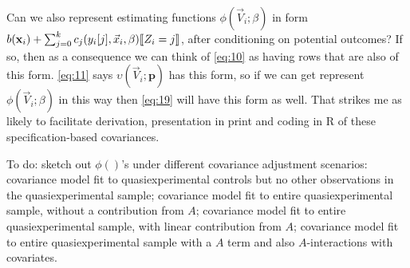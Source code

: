\documentclass{article}
\DeclarePairedDelimiter{\indicator}{\llbracket}{\rrbracket}
\newcommand{\absorbInterceptsEF}{\upsilon}
\begin{document}
Can we also represent estimating functions
$\phi(\vec{V}_{i}; \beta)$ in form
$b(\mathbf{x}_{i}) + \sum_{j=0}^{k}c_{j}(y_{i}[j], \vec{x}_{i}, \beta)\indicator{Z_{i}=j}$, after conditioning
on potential outcomes? If so, then as a consequence we can think of
\eqref{eq:10} as having rows that are also of this form.
\eqref{eq:11} says $\absorbInterceptsEF(\vec{V}_{i}; \mathbf{p})$
has this form, so if we can get represent
$\phi(\vec{V}_{i}; \beta)$ in this way then \eqref{eq:19}
will have this form as well. That strikes me as likely to facilitate
derivation,
presentation in print and coding in R of these specification-based covariances.

To do:
sketch out $\phi()$'s under different covariance adjustment scenarios:
covariance model fit to quasiexperimental controls but no other
observations in the quasiexperimental sample; covariance model fit to
entire quasiexperimental sample, without a contribution from $A$;
covariance model fit to entire quasiexperimental sample, with linear
contribution from $A$; covariance model fit to entire
quasiexperimental sample with a $A$ term and also $A$-interactions
with covariates.

\end{document}
